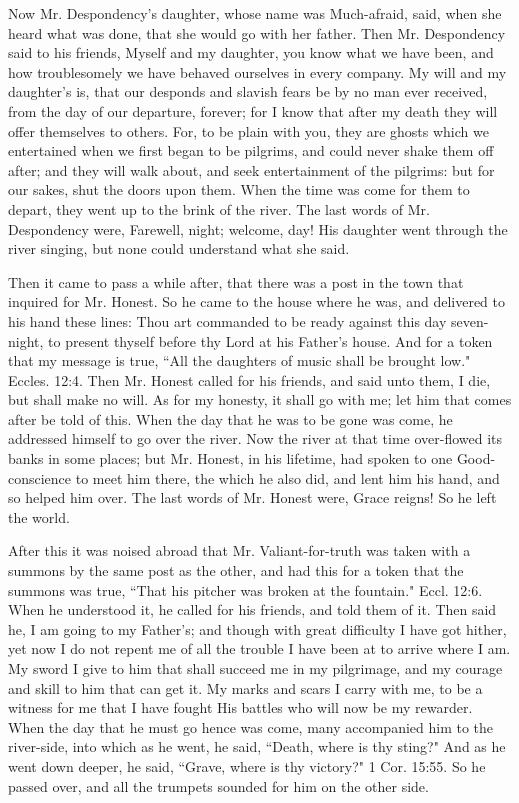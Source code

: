 Now Mr. Despondency's daughter, whose name was Much-afraid, said, when she heard what was done, that she would go with her father. Then Mr. Despondency said to his friends, Myself and my daughter, you know what we have been, and how troublesomely we have behaved ourselves in every company. My will and my daughter's is, that our desponds and slavish fears be by no man ever received, from the day of our departure, forever; for I know that after my death they will offer themselves to others. For, to be plain with you, they are ghosts which we entertained when we first began to be pilgrims, and could never shake them off after; and they will walk about, and seek entertainment of the pilgrims: but for our sakes, shut the doors upon them. When the time was come for them to depart, they went up to the brink of the river. The last words of Mr. Despondency were, Farewell, night; welcome, day! His daughter went through the river singing, but none could understand what she said.

Then it came to pass a while after, that there was a post in the town that inquired for Mr. Honest. So he came to the house where he was, and delivered to his hand these lines: Thou art commanded to be ready against this day seven-night, to present thyself before thy Lord at his Father's house. And for a token that my message is true, ``All the daughters of music shall be brought low." Eccles. 12:4. Then Mr. Honest called for his friends, and said unto them, I die, but shall make no will. As for my honesty, it shall go with me; let him that comes after be told of this. When the day that he was to be gone was come, he addressed himself to go over the river. Now the river at that time over-flowed its banks in some places; but Mr. Honest, in his lifetime, had spoken to one Good-conscience to meet him there, the which he also did, and lent him his hand, and so helped him over. The last words of Mr. Honest were, Grace reigns! So he left the world.

After this it was noised abroad that Mr. Valiant-for-truth was taken with a summons by the same post as the other, and had this for a token that the summons was true, ``That his pitcher was broken at the fountain." Eccl. 12:6. When he understood it, he called for his friends, and told them of it. Then said he, I am going to my Father's; and though with great difficulty I have got hither, yet now I do not repent me of all the trouble I have been at to arrive where I am. My sword I give to him that shall succeed me in my pilgrimage, and my courage and skill to him that can get it. My marks and scars I carry with me, to be a witness for me that I have fought His battles who will now be my rewarder. When the day that he must go hence was come, many accompanied him to the river-side, into which as he went, he said, ``Death, where is thy sting?" And as he went down deeper, he said, ``Grave, where is thy victory?" 1 Cor. 15:55. So he passed over, and all the trumpets sounded for him on the other side.

